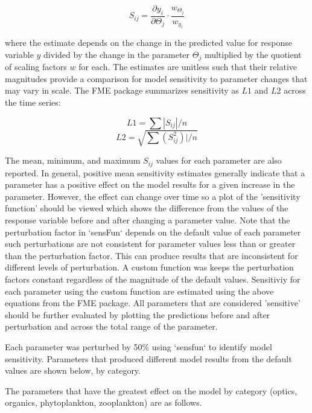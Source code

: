 \documentclass[letterpaper,12pt,oneside]{article}\usepackage[]{graphicx}\usepackage[]{color}
\begin{document}
\begin{equation}
S_{ij} = \frac{\partial y_i}{\partial \Theta_j}\cdot\frac{w_{\Theta_j}}{w_{y_i}}
\end{equation}

where the estimate depends on the change in the predicted value for response variable $y$ divided by the change in the parameter $\Theta_j$ multiplied by the quotient of scaling factors $w$ for each.  The estimates are unitless such that their relative magnitudes provide a comparison for model sensitivity to parameter changes that may vary in scale.  The FME package summarizes sensitivity as $L1$ and $L2$ across the time series:

\begin{equation}
L1 = \sum|S_{ij}|/n
\end{equation}
\begin{equation}
L2 = \sqrt{\sum\left(S_{ij}^2\right)|/n}
\end{equation}

The mean, minimum, and maximum $S_{ij}$ values for each parameter are also reported.  In general, positive mean sensitivity estimates generally indicate that a parameter has a positive effect on the model results for a given increase in the parameter.  However, the effect can change over time so a plot of the 'sensitivity function' should be viewed which shows the difference from the values of the response variable before and after changing a parameter value.  Note that the perturbation factor in `sensFun` depends on the default value of each parameter such perturbations are not consistent for parameter values less than or greater than the perturbation factor.  This can produce results that are inconsistent for different levels of perturbation.  A custom function was keeps the perturbation factors constant regardless of the magnitude of the default values.  Sensitiviy for each parameter using the custom function are estimated using the above equations from the FME package. All parameters that are considered 'sensitive' should be further evaluated by plotting the predictions before and after perturbation and across the total range of the parameter. 


Each parameter was perturbed by 50\% using `sensfun` to identify model sensitivity.  Parameters that produced different model results from the default values are shown below, by category. 

The parameters that have the greatest effect on the model by category (optics, organics, phytoplankton, zooplankton) are as follows.
\end{document}
